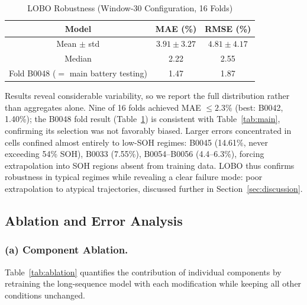 \begin{table}[H]
  \caption{LOBO Robustness (Window-30 Configuration, 16 Folds)}
  \label{tab:lobo}
  \centering
  \small
  \tabairy
  \begin{tabular}{|c|c|c|}
    \hline
    \textbf{Model} & \textbf{MAE (\%)} & \textbf{RMSE (\%)} \\
    \hline
    Mean $\pm$ std                        & $3.91 \pm 3.27$ & $4.81 \pm 4.17$ \\
    Median                                & 2.22            & 2.55            \\
    Fold B0048 ($=$ main battery testing) & 1.47            & 1.87            \\
    \hline
  \end{tabular}
\end{table}

Results reveal considerable variability, so we report the full distribution
rather than aggregates alone. Nine of 16 folds achieved MAE $\le 2.3\%$ (best:
B0042, 1.40\%); the B0048 fold result (Table~\ref{tab:lobo}) is consistent with
Table~\ref{tab:main}, confirming its selection was not favorably biased. Larger
errors concentrated in cells confined almost entirely to low-SOH regimes: B0045
(14.61\%, never exceeding 54\% SOH), B0033 (7.55\%), B0054--B0056
(4.4--6.3\%), forcing extrapolation into SOH regions absent from training data.
LOBO thus confirms robustness in typical regimes while revealing a clear failure
mode: poor extrapolation to atypical trajectories, discussed further in
Section~\ref{sec:discussion}.

\subsection{Ablation and Error Analysis}
\label{subsec:ablation}

\subsubsection{(a) Component Ablation.}
Table~\ref{tab:ablation} quantifies the contribution of individual components by
retraining the long-sequence model with each modification while keeping all
other conditions unchanged.

